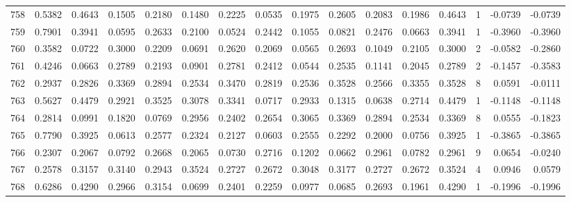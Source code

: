\begin{tabular}{lrrrrrrrrrrrrrrr}
758 &      0.5382 &  0.4643 &  0.1505 &  0.2180 &  0.1480 &  0.2225 &  0.0535 &  0.1975 &  0.2605 &  0.2083 &   0.1986 &     0.4643 &      1 &                   -0.0739 &                    -0.0739 \\
759 &      0.7901 &  0.3941 &  0.0595 &  0.2633 &  0.2100 &  0.0524 &  0.2442 &  0.1055 &  0.0821 &  0.2476 &   0.0663 &     0.3941 &      1 &                   -0.3960 &                    -0.3960 \\
760 &      0.3582 &  0.0722 &  0.3000 &  0.2209 &  0.0691 &  0.2620 &  0.2069 &  0.0565 &  0.2693 &  0.1049 &   0.2105 &     0.3000 &      2 &                   -0.0582 &                    -0.2860 \\
761 &      0.4246 &  0.0663 &  0.2789 &  0.2193 &  0.0901 &  0.2781 &  0.2412 &  0.0544 &  0.2535 &  0.1141 &   0.2045 &     0.2789 &      2 &                   -0.1457 &                    -0.3583 \\
762 &      0.2937 &  0.2826 &  0.3369 &  0.2894 &  0.2534 &  0.3470 &  0.2819 &  0.2536 &  0.3528 &  0.2566 &   0.3355 &     0.3528 &      8 &                    0.0591 &                    -0.0111 \\
763 &      0.5627 &  0.4479 &  0.2921 &  0.3525 &  0.3078 &  0.3341 &  0.0717 &  0.2933 &  0.1315 &  0.0638 &   0.2714 &     0.4479 &      1 &                   -0.1148 &                    -0.1148 \\
764 &      0.2814 &  0.0991 &  0.1820 &  0.0769 &  0.2956 &  0.2402 &  0.2654 &  0.3065 &  0.3369 &  0.2894 &   0.2534 &     0.3369 &      8 &                    0.0555 &                    -0.1823 \\
765 &      0.7790 &  0.3925 &  0.0613 &  0.2577 &  0.2324 &  0.2127 &  0.0603 &  0.2555 &  0.2292 &  0.2000 &   0.0756 &     0.3925 &      1 &                   -0.3865 &                    -0.3865 \\
766 &      0.2307 &  0.2067 &  0.0792 &  0.2668 &  0.2065 &  0.0730 &  0.2716 &  0.1202 &  0.0662 &  0.2961 &   0.0782 &     0.2961 &      9 &                    0.0654 &                    -0.0240 \\
767 &      0.2578 &  0.3157 &  0.3140 &  0.2943 &  0.3524 &  0.2727 &  0.2672 &  0.3048 &  0.3177 &  0.2727 &   0.2672 &     0.3524 &      4 &                    0.0946 &                     0.0579 \\
768 &      0.6286 &  0.4290 &  0.2966 &  0.3154 &  0.0699 &  0.2401 &  0.2259 &  0.0977 &  0.0685 &  0.2693 &   0.1961 &     0.4290 &      1 &                   -0.1996 &                    -0.1996 \\

\end{tabular}
